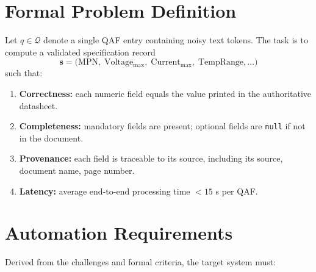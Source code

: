 \section{Formal Problem Definition}
Let $q \in \mathcal{Q}$ denote a single QAF entry containing noisy text tokens.  
The task is to compute a validated specification record  
\[
\mathbf{s} = \bigl(\mathrm{MPN},\; \mathrm{Voltage_{max}},\; \mathrm{Current_{max}},\; \mathrm{TempRange},\dots\bigr)
\]  
such that:

\begin{enumerate}
  \item \textbf{Correctness:} each numeric field equals the value printed in the authoritative datasheet.
  \item \textbf{Completeness:} mandatory fields are present; optional fields are \texttt{null} if not in the document.  
  \item \textbf{Provenance:} each field is traceable to its source, including its source, document name, page number.
  \item \textbf{Latency:} average end-to-end processing time $<15$ s per QAF.  
\end{enumerate}

\section{Automation Requirements}
Derived from the challenges and formal criteria, the target system must:

